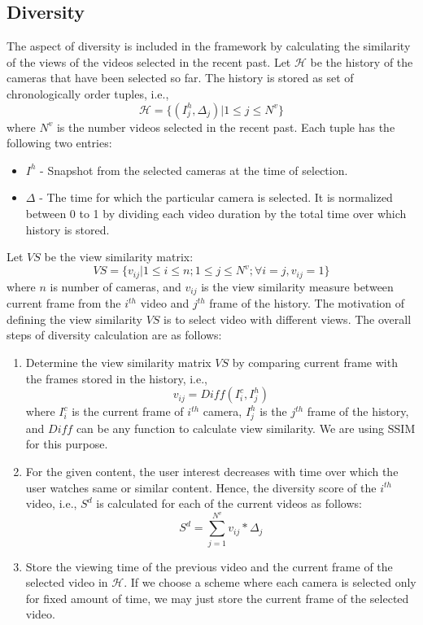 \documentclass{sig-alternate}
\begin{document}
\subsection{Diversity}
The aspect of diversity is included in the framework by calculating
the similarity of the views of the videos selected in the recent
past. Let $\mathcal{H}$ be the history of the cameras that have been selected so far. The history is stored as set of chronologically order tuples, i.e.,
\begin{equation}
    \mathcal{H}=\{(I_j^h,\Delta_j)|1\leq j\leq N^v\}
\end{equation}
where $N^v$ is the number videos selected in the recent past. Each
tuple has the following two entries:
\begin{itemize}
    \item $I^h$ - Snapshot from the selected cameras at the time of selection.
    \item $\Delta$ - The time for which the particular camera is selected. It is normalized between 0 to 1 by dividing each video duration by the total time over which history is stored. 
\end{itemize}
Let $VS$ be the view similarity matrix:
\begin{equation}
    VS=\{v_{ij}|1\leq i\leq n;1\leq j\leq N^v;\forall i=j,v_{ij}=1\}
\end{equation}
where $n$ is number of cameras, and $v_{ij}$ is the view similarity
measure between current frame from the $i^{th}$ video and $j^{th}$ frame of the history. The motivation of defining the view similarity $VS$ is to select video with different views. The overall steps of diversity calculation are as follows:
\begin{enumerate}
    \item Determine the view similarity matrix $VS$ by comparing current frame with the frames stored in the history, i.e.,
    \begin{equation}\label{eq:15}
        v_{ij}=Diff(I_i^c,I_j^h)
    \end{equation}
    where $I_i^c$ is the current frame of $i^{th}$ camera, $I_j^h$ is the $j^{th}$ frame of the history, and $Diff$ can be any function to calculate view similarity. We are using SSIM \cite{17} for this purpose.
    \item For the given content, the user interest decreases with time over which the user watches same or similar content. Hence, the diversity score of the $i^{th}$ video, i.e., $S^d$ is calculated for each of the current videos as follows:
    \begin{equation}
        S^d=\sum_{j=1}^{N^v}v_{ij}*\Delta_j
    \end{equation}
    \item Store the viewing time of the previous video and the current frame of the selected video in $\mathcal{H}$. If we choose a scheme where each camera is selected only for fixed amount of time, we may just store the current frame of the selected video.
\end{enumerate}
\end{document}
